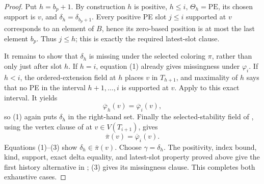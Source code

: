\begin{proof}
Put \(h=b_p+1\).  By construction \(h\) is positive, \(h\leq i\),
\(\Theta_h=\mathrm{PE}\), its chosen support is \(v\), and
\(\delta_h=\delta_{b_p+1}\).  Every positive PE slot \(j\leq i\)
supported at \(v\) corresponds to an element of \(B\), hence its
zero-based position is at most the last element \(b_p\).  Thus \(j\leq h\);
this is exactly the required latest-slot clause.

It remains to show that \(\delta_h\) is missing under the selected
coloring \(\pi\), rather than only just after slot \(h\).  If \(h=i\),
equation (1) already gives missingness under \(\varphi_i\).  If \(h<i\),
the ordered-extension field at \(h\) places \(v\) in \(T_{h+1}\), and
maximality of \(h\) says that no PE in the interval
\(h+1,\ldots,i\) is supported at \(v\).  Apply
 to this exact interval.  It yields
\[
          \overline{\varphi}_{h}(v)
             =\overline{\varphi}_{i}(v),                       \tag{2}
\]
so (1) again puts \(\delta_h\) in the right-hand set.  Finally the
selected-stability field of , using the
vertex clause of  at
\(v\in V(T_{i+1})\), gives
\[
                 \overline\pi(v)=\overline{\varphi}_i(v).       \tag{3}
\]
Equations (1)--(3) show
\(\delta_h\in\overline\pi(v)\).  Choose
\(\gamma=\delta_h\).  The positivity, index bound, kind, support, exact
delta equality, and latest-slot property proved above give the first
history alternative in ; (3) gives its
missingness clause.  This completes both exhaustive cases.
\end{proof}
